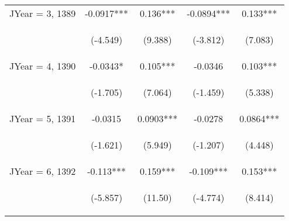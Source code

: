 \documentclass[]{article}
\begin{document}
\begin{center}
\begin{tabular}{lcccc}
JYear = 3, 1389 & -0.0917*** & 0.136*** & -0.0894*** & 0.133*** \\
\vspace{4pt} & \begin{footnotesize}(-4.549)\end{footnotesize} & \begin{footnotesize}(9.388)\end{footnotesize} & \begin{footnotesize}(-3.812)\end{footnotesize} & \begin{footnotesize}(7.083)\end{footnotesize} \\
JYear = 4, 1390 & -0.0343* & 0.105*** & -0.0346 & 0.103*** \\
\vspace{4pt} & \begin{footnotesize}(-1.705)\end{footnotesize} & \begin{footnotesize}(7.064)\end{footnotesize} & \begin{footnotesize}(-1.459)\end{footnotesize} & \begin{footnotesize}(5.338)\end{footnotesize} \\
JYear = 5, 1391 & -0.0315 & 0.0903*** & -0.0278 & 0.0864*** \\
\vspace{4pt} & \begin{footnotesize}(-1.621)\end{footnotesize} & \begin{footnotesize}(5.949)\end{footnotesize} & \begin{footnotesize}(-1.207)\end{footnotesize} & \begin{footnotesize}(4.448)\end{footnotesize} \\
JYear = 6, 1392 & -0.113*** & 0.159*** & -0.109*** & 0.153*** \\
\vspace{4pt} & \begin{footnotesize}(-5.857)\end{footnotesize} & \begin{footnotesize}(11.50)\end{footnotesize} & \begin{footnotesize}(-4.774)\end{footnotesize} & \begin{footnotesize}(8.414)\end{footnotesize} \\

\end{tabular}
\end{center}
\end{document}

